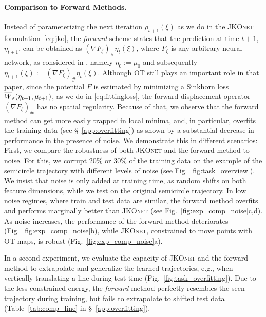 \paragraph{Comparison to Forward Methods.} \label{sec:eval_comp_fb}
Instead of parameterizing the next iteration $\rho_{t+1}(\xi)$ as we do in the \textsc{JKOnet} formulation~\eqref{eq:jko}, the \emph{forward} scheme states that the prediction at time $t+1$, $\eta_{t+1}$, can be obtained as $(\nabla F_\xi)_{\#} \eta_t(\xi)$, where $F_\xi$ is any arbitrary neural network, as considered in \citet{hashimoto2016learning}, namely $\eta_0:=\mu_0$ and subsequently $\eta_{t+1}(\xi):=(\nabla F_\xi)_{\#} \eta_t(\xi)$. Although OT still plays an important role in that paper, since the potential $F$ is estimated by minimizing a Sinkhorn loss $\overline{W}_{\varepsilon}(\eta_{t+1},\mu_{t+1})$, as we do in \eqref{eq:fittingloss}, the forward displacement operator $(\nabla F_\xi)_{\#}$ has no spatial regularity. Because of that, we observe that the forward method can get more easily trapped in local minima, and, in particular, overfits the training data (see \S~\ref{app:overfitting}) as shown by a substantial decrease in performance in the presence of noise.
We demonstrate this in different scenarios: 
First, we compare the robustness of both \textsc{JKOnet} and the forward method to noise. For this, we corrupt $20\%$ or $30\%$ of the training data on the example of the semicircle trajectory with different levels of noise (see Fig.~\ref{fig:task_overview}). We insist that noise is only added at training time, as random shifts on both feature dimensions, while we test on the original semicircle trajectory.
In low noise regimes, where train and test data are similar, the forward method overfits and performs marginally better than \textsc{JKOnet} (see Fig.~\ref{fig:exp_comp_noise}c,d). As noise increases, the performance of the forward method deteriorates (Fig.~\ref{fig:exp_comp_noise}b), while \textsc{JKOnet}, constrained to move points with OT maps, is robust (Fig.~\ref{fig:exp_comp_noise}a).%

In a second experiment, we evaluate the capacity of \textsc{JKOnet} and the forward method to extrapolate and generalize the learned trajectories, e.g., when vertically translating a line during test time (Fig.~\ref{fig:task_overfitting}).
Due to the less constrained energy, the \emph{forward} method perfectly resembles the seen trajectory during training, but fails to extrapolate to shifted test data (Table~\ref{tab:comp_line} in \S~\ref{app:overfitting}).

